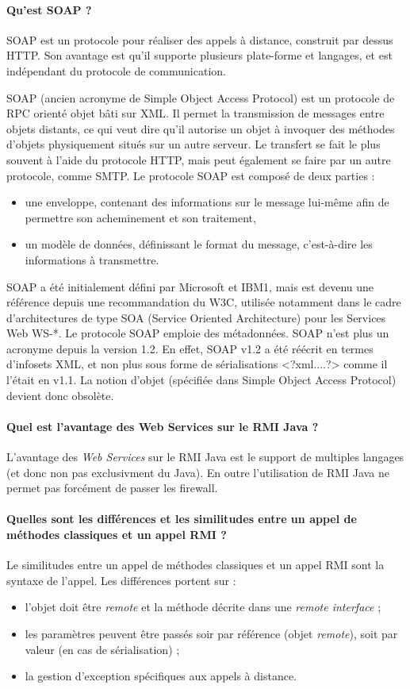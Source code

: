 \documentclass[a4paper]{article}
\begin{document}
\paragraph{Qu'est SOAP ?}
SOAP est un protocole pour réaliser des appels à distance, construit par dessus HTTP. Son avantage est qu’il supporte plusieurs plate-forme et langages, et est indépendant du protocole de communication.

SOAP (ancien acronyme de Simple Object Access Protocol) est un protocole de RPC orienté objet bâti sur XML.
Il permet la transmission de messages entre objets distants, ce qui veut dire qu'il autorise un objet à invoquer des méthodes d'objets physiquement situés sur un autre serveur. Le transfert se fait le plus souvent à l'aide du protocole HTTP, mais peut également se faire par un autre protocole, comme SMTP. Le protocole SOAP est composé de deux parties :
\begin{itemize}
\item une enveloppe, contenant des informations sur le message lui-même afin de permettre son acheminement et son traitement,
\item un modèle de données, définissant le format du message, c'est-à-dire les informations à transmettre.
\end{itemize}
SOAP a été initialement défini par Microsoft et IBM1, mais est devenu une référence depuis une recommandation du W3C, utilisée notamment dans le cadre d'architectures de type SOA (Service Oriented Architecture) pour les Services Web WS-*. Le protocole SOAP emploie des métadonnées. SOAP n'est plus un acronyme depuis la version 1.2. En effet, SOAP v1.2 a été réécrit en termes d'infosets XML, et non plus sous forme de sérialisations <?xml....?> comme il l'était en v1.1. La notion d'objet (spécifiée dans Simple Object Access Protocol) devient donc obsolète.

\paragraph{Quel est l'avantage des Web Services sur le RMI Java ?}
L'avantage des \textit{Web Services} sur le RMI Java est le support de multiples langages (et donc non pas exclusivment du Java). En outre l'utilisation de RMI Java ne permet pas forcément de passer les firewall.

\paragraph{Quelles sont les différences et les similitudes entre un appel de méthodes classiques et un appel RMI ?}
Le similitudes entre un appel de méthodes classiques et un appel RMI sont la syntaxe de l'appel. Les différences portent sur :
\begin{itemize}
\item l'objet doit être \textit{remote} et la méthode décrite dans une \textit{remote interface} ;
\item les paramètres peuvent être passés soir par référence (objet \textit{remote}), soit par valeur (en cas de sérialisation) ;
\item la gestion d'exception spécifiques aux appels à distance.
\end{itemize}
\end{document}
